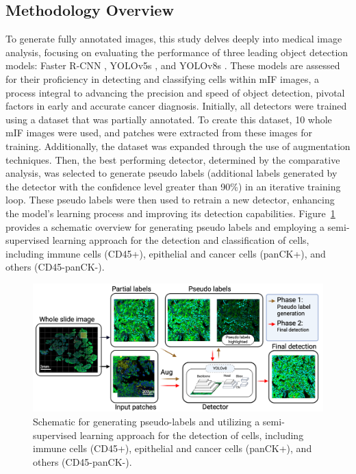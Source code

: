 \documentclass{midl} %
\begin{document}
\subsection{Methodology Overview}
To generate fully annotated images, this study delves deeply into medical image analysis, focusing on evaluating the performance of three leading object detection models: Faster R-CNN \cite{ren2015faster}, YOLOv5s \cite{yolov5}, and YOLOv8s \cite{ultralytics2023}. These models are assessed for their proficiency in detecting and classifying cells within mIF images, a process integral to advancing the precision and speed of object detection, pivotal factors in early and accurate cancer diagnosis. Initially, all detectors were trained using a dataset that was partially annotated. To create this dataset, 10 whole mIF images were used, and patches were extracted from these images for training. Additionally, the dataset was expanded through the use of augmentation techniques. Then, the best performing detector, determined by the comparative analysis, was selected to generate pseudo labels (additional labels generated by the detector with the confidence level greater than 90\%) in an iterative training loop. These pseudo labels were then used to retrain a new detector, enhancing the model’s learning process and improving its detection capabilities. Figure~\ref{fig:1} provides a schematic overview for generating pseudo labels and employing a semi-supervised learning approach for the detection and classification of cells, including immune cells (CD45+), epithelial and cancer cells (panCK+), and others (CD45-panCK-). 
\begin{figure}[!htbp]
\centering
\includegraphics[width=0.9\linewidth]{images/1.png}
\caption{Schematic for generating pseudo-labels and utilizing a semi-supervised learning approach for the detection of cells, including immune cells (CD45+), epithelial and cancer cells (panCK+), and others (CD45-panCK-).}
\label{fig:1}
\end{figure}
\setlength{\floatsep}{0pt}
\setlength{\textfloatsep}{1pt}
\setlength{\intextsep}{0pt}
\end{document}
